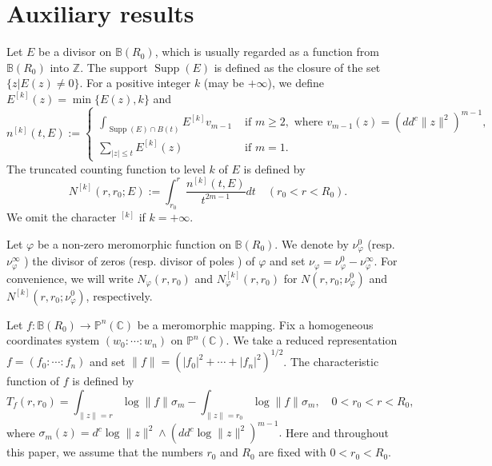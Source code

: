 \documentclass[12pt, a4paper, oneside]{amsart}
\newcommand{\C}{{\mathbb{C}}}
\newcommand{\B}{\mathbb{B}}
\renewcommand{\P}{{\mathbb{P}}}
\numberwithin{equation}{section}
\begin{document}
\section{Auxiliary results}
Let $E$ be a divisor on $\B(R_0)$, which is usually regarded as a function from $\B(R_0)$ into $\mathbb Z$. The support $\operatorname{Supp}(E)$ is defined as the closure of the set $\{z|E(z)\ne 0\}$. 
For a positive integer $k$ (may be $+\infty$), we define $E^{[k]}(z)=\min\{E(z),k\}$ and
$$n^{[k]}(t, E):= 
\begin{cases}\int_{\operatorname{Supp}(E) \cap B(t)} E^{[k]} v_{m-1} & \text { if } m \geq 2, \text{ where }v_{m-1}(z)=\left(dd^c\|z\|^2\right)^{m-1},\\
 \sum_{|z| \leq t} E^{[k]}(z) & \text { if } m=1.
\end{cases}$$
The truncated counting function to level $k$ of $E$ is defined by
$$N^{[k]}\left(r, r_{0} ; E\right):=\int_{r_{0}}^{r} \frac{n^{[k]}(t, E)}{t^{2 m-1}} d t \quad\left(r_{0}<r<R_{0}\right).$$
We omit the character ${ }^{[k]}$ if $k=+\infty$.

Let $\varphi$ be a non-zero meromorphic function on $\B(R_0)$. We denote by $\nu_{\varphi}^{0}$ (resp. $\nu_{\varphi}^{\infty}$ ) the divisor of zeros (resp. divisor of poles ) of $\varphi$ and set $\nu_{\varphi}=\nu_{\varphi}^{0}-\nu_{\varphi}^{\infty}$.
For convenience, we will write $N_{\varphi}\left(r, r_{0}\right)$ and $N_{\varphi}^{[k]}\left(r, r_{0}\right)$ for $N\left(r, r_{0} ; \nu_{\varphi}^{0}\right)$ and $N^{[k]}\left(r, r_{0} ; \nu_{\varphi}^{0}\right)$, respectively.

Let $f:\B(R_0) \longrightarrow \P^n(\C)$ be a meromorphic mapping. Fix a homogeneous coordinates system $\left(w_{0}: \cdots: w_{n}\right)$ on $\P^n(\C)$. We take a reduced representation $f=\left(f_{0}: \cdots: f_{n}\right)$ and set $\|f\|=\left(\left|f_{0}\right|^{2}+\cdots+\left|f_{n}\right|^{2}\right)^{1 / 2}$. 
The characteristic function of $f$ is defined by
$$T_f(r, r_{0})=\int_{\|z\|=r} \log \|f\| \sigma_{m}-\int_{\|z\|=r_0} \log \|f\| \sigma_{m}, \quad 0<r_{0}<r<R_{0},$$
where $\sigma_{m}(z)=d^c \log \|z\|^2\wedge(dd^c\log \|z\|^{2})^{m-1}.$ Here and throughout this paper, we assume that the numbers $r_{0}$ and $R_{0}$ are fixed with $0<r_{0}<R_{0}$. 
\end{document}
